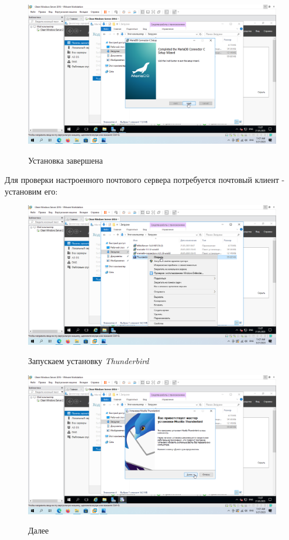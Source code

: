 \documentclass[a4paper]{article}
\begin{document}
  \begin{figure}[H]
    \centering
    \includegraphics[width=\textwidth]{11_0028}
    \label{img:28}
    \caption{Установка завершена}
  \end{figure}

  Для проверки настроенного почтового сервера потребуется почтовый клиент - установим его:

  \begin{figure}[H]
    \centering
    \includegraphics[width=\textwidth]{11_0029}
    \label{img:29}
    \caption{Запускаем установку \textit{Thunderbird}}
  \end{figure}

  \begin{figure}[H]
    \centering
    \includegraphics[width=\textwidth]{11_0030}
    \label{img:30}
    \caption{Далее}
  \end{figure}
\end{document}
